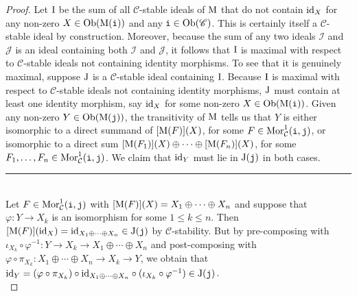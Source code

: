\noindent\begin{proof} Let $\textup{I}$ be the sum %
of all $\mathscr{C}$-stable ideals of $\textup{M}$ that do not contain $\textup{id}_X$ for any non-zero $X \in \textup{Ob}(\textup{M}(\textup{\texttt{i}}))$ and any $\textup{\texttt{i}} \in \textup{Ob}(\mathscr{C})$. This is certainly itself a $\mathscr{C}$-stable ideal by construction. Moreover, because the sum of any two ideals $\mathcal{I}$ and $\mathcal{J}$ is an ideal containing both $\mathcal{I}$ and $\mathcal{J}$, it follows that %
$\textup{I}$ is maximal with respect to $\mathscr{C}$-stable ideals not containing identity morphisms. To see that it is genuinely maximal, suppose $\textup{J}$ is a $\mathscr{C}$-stable ideal containing $\textup{I}$. %
Because $\textup{I}$ is maximal with respect to $\mathscr{C}$-stable ideals not containing identity morphisms, $\textup{J}$ must contain at least one identity morphism, say $\textup{id}_X$ for some non-zero $X \in \textup{Ob}(\textup{M}(\textup{\texttt{i}}))$. Given any non-zero $Y \in \textup{Ob}(\textup{M}(\textup{\texttt{j}}))$, the transitivity of $\textup{M}$ tells us that $Y$ is either isomorphic to a direct summand of $[\textup{M}(F)](X)$, for some $F \in \textup{Mor}_\mathcal{C}^1(\textup{\texttt{i}}, \textup{\texttt{j}})$, or isomorphic to a direct sum $[\textup{M}(F_1)](X) \oplus \cdots \oplus [\textup{M}(F_n)](X)$, for some $F_1, \dots, F_n \in \textup{Mor}_\mathcal{C}^1(\textup{\texttt{i}}, \textup{\texttt{j}})$. We claim that $\textup{id}_Y$ must lie in $\textup{J}(\textup{\texttt{j}})$ in both cases.\\[-1.5\baselineskip]
\begin{center}
\rule{0.5\linewidth}{1pt}
\end{center}
\noindent\\[-\baselineskip]
\noindent Let $F \in \textup{Mor}_\mathcal{C}^1(\textup{\texttt{i}}, \textup{\texttt{j}})$ with $[\textup{M}(F)](X) = X_1 \oplus \cdots \oplus X_n$ and suppose that $\varphi : Y \to X_k$ is an isomorphism for some $1 \leq k \leq n$. Then $[\textup{M}(F)](\textup{id}_X) = \textup{id}_{X_1 \oplus \cdots \oplus X_n} \in \textup{J}(\textup{\texttt{j}})$ by $\mathscr{C}$-stability. But by pre-composing with $\iota_{X_k} \circ \varphi^{-1} : Y \to X_k \to X_1 \oplus \cdots \oplus X_n$ and post-composing with $\varphi \circ \pi_{X_k} : X_1 \oplus \cdots \oplus X_n \to X_k \to Y$, we obtain that $\textup{id}_Y = (\varphi \circ \pi_{X_k}) \circ \textup{id}_{X_1 \oplus \cdots \oplus X_n} \circ (\iota_{X_k} \circ \varphi^{-1}) \in \textup{J}(\textup{\texttt{j}})$.\\[-1.5\baselineskip]

\end{proof}
